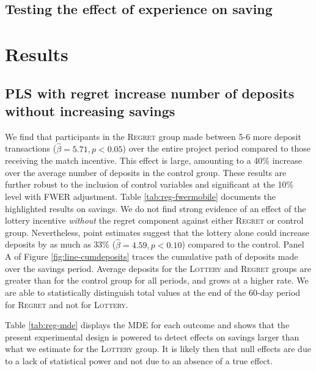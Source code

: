 \documentclass[11pt]{article}
\begin{document}
	\subsection{Testing the effect of experience on saving}


\section{Results} \label{sec:results}


	\subsection{PLS with regret increase number of deposits without increasing savings}

		We find that participants in the \textsc{Regret} group made between 5-6 more deposit transactions ($\hat \beta = 5.71, p < 0.05$) over the entire project period compared to those receiving the match incentive. This effect is large, amounting to a 40\% increase over the average number of deposits in the control group. These results are further robust to the inclusion of control variables and significant at the 10\% level with FWER adjustment. Table \ref{tab:reg-fwermobile} documents the highlighted results on savings. We do not find strong evidence of an effect of the lottery incentive \textit{without} the regret component against either \textsc{Regret} or control group. Nevertheless, point estimates suggest that the lottery alone could increase deposits by as much as 33\% ($\hat \beta = 4.59, p < 0.10$) compared to the control. Panel A of Figure \ref{fig:line-cumdeposits} traces the cumulative path of deposits made over the savings period. Average deposits for the \textsc{Lottery} and \textsc{Regret} groups are greater than for the control group for all periods, and grows at a higher rate. We are able to statistically distinguish total values at the end of the 60-day period for \textsc{Regret} and not for \textsc{Lottery}.

		Table \ref{tab:reg-mde} displays the MDE for each outcome and shows that the present experimental design is powered to detect effects on savings larger than what we estimate for the \textsc{Lottery} group. It is likely then that null effects are due to a lack of statistical power and not due to an absence of a true effect.
\end{document}
